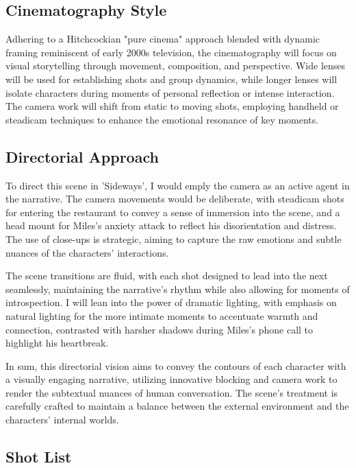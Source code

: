 \documentclass[12pt]{article}
\begin{document}
\subsection*{Cinematography Style}

Adhering to a Hitchcockian "pure cinema" approach blended with dynamic framing reminiscent of early 2000s television, the cinematography will focus on visual storytelling through movement, composition, and perspective. Wide lenses will be used for establishing shots and group dynamics, while longer lenses will isolate characters during moments of personal reflection or intense interaction. The camera work will shift from static to moving shots, employing handheld or steadicam techniques to enhance the emotional resonance of key moments.


\subsection*{Directorial Approach}

To direct this scene in 'Sideways', I would emply the camera as an active agent in the narrative. The camera movements would be deliberate, with steadicam shots for entering the restaurant to convey a sense of immersion into the scene, and a head mount for Miles's anxiety attack to reflect his disorientation and distress. The use of close-ups is strategic, aiming to capture the raw emotions and subtle nuances of the characters' interactions.

The scene transitions are fluid, with each shot designed to lead into the next seamlessly, maintaining the narrative's rhythm while also allowing for moments of introspection. I will lean into the power of dramatic lighting, with emphasis on natural lighting for the more intimate moments to accentuate warmth and connection, contrasted with harsher shadows during Miles's phone call to highlight his heartbreak.

In sum, this directorial vision aims to convey the contours of each character with a visually engaging narrative, utilizing innovative blocking and camera work to render the subtextual nuances of human conversation. The scene's treatment is carefully crafted to maintain a balance between the external environment and the characters' internal worlds.


\vspace{70pt} 

\subsection*{Shot List} 
\end{document}
